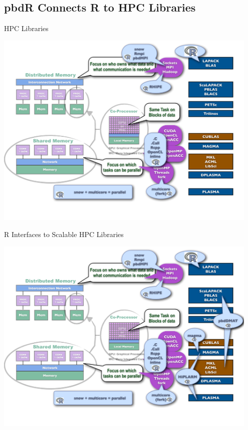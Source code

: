 \subsection{pbdR Connects R to HPC Libraries}

\begin{frame}
\begin{block}{HPC Libraries}
    
\includegraphics[width=0.95\textwidth]
{../common/pics/hardware/ParallelHardware11.pdf}
\end{block}
\end{frame}

\begin{frame}
\begin{block}{R Interfaces to Scalable HPC Libraries}
    
\includegraphics[width=0.95\textwidth]
{../common/pics/hardware/ParallelHardware12.pdf}
\end{block}
\end{frame}

